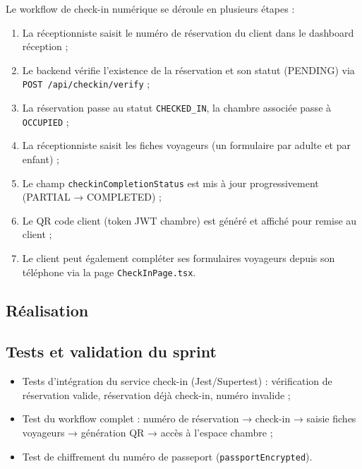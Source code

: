 Le workflow de check-in numérique se déroule en plusieurs étapes :

\begin{enumerate}
  \item La réceptionniste saisit le numéro de réservation du client dans le dashboard réception ;
  \item Le backend vérifie l'existence de la réservation et son statut (PENDING) via \texttt{POST /api/checkin/verify} ;
  \item La réservation passe au statut \texttt{CHECKED\_IN}, la chambre associée passe à \texttt{OCCUPIED} ;
  \item La réceptionniste saisit les fiches voyageurs (un formulaire par adulte et par enfant) ;
  \item Le champ \texttt{checkinCompletionStatus} est mis à jour progressivement (PARTIAL → COMPLETED) ;
  \item Le QR code client (token JWT chambre) est généré et affiché pour remise au client ;
  \item Le client peut également compléter ses formulaires voyageurs depuis son téléphone via la page \texttt{CheckInPage.tsx}.
\end{enumerate}

\subsection{Réalisation}


\subsection{Tests et validation du sprint}

\begin{itemize}
  \item Tests d'intégration du service check-in (Jest/Supertest) : vérification de réservation valide, réservation déjà check-in, numéro invalide ;
  \item Test du workflow complet : numéro de réservation → check-in → saisie fiches voyageurs → génération QR → accès à l'espace chambre ;
  \item Test de chiffrement du numéro de passeport (\texttt{passportEncrypted}).
\end{itemize}


